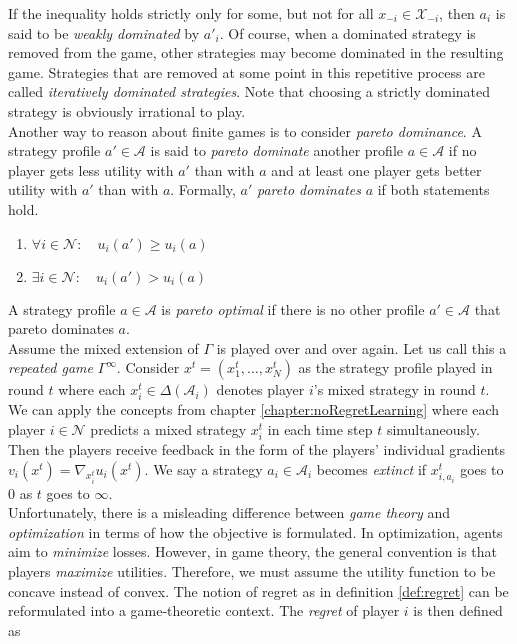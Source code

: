 If the inequality holds strictly only for some, but not for all $x_{-i} \in \mathcal{X}_{-i}$, then $a_i$ is said to be \textit{weakly dominated} by $a'_i$. Of course, when a dominated strategy is removed from the game, other strategies may become dominated in the resulting game. Strategies that are removed at some point in this repetitive process are called \textit{iteratively dominated strategies}. Note that choosing a strictly dominated strategy is obviously irrational to play. \\

Another way to reason about finite games is to consider \textit{pareto dominance}. A strategy profile $a' \in \mathcal{A}$ is said to \textit{pareto dominate} another profile $a \in \mathcal{A}$ if no player gets less utility with $a'$ than with $a$ and at least one player gets better utility with $a'$ than with $a$. Formally, $a'$ \textit{pareto dominates} $a$ if both statements hold.

\begin{enumerate}\centering
    \item $\forall i \in \mathcal{N}: \quad u_i(a') \ge u_i(a)$
    \item $\exists i \in \mathcal{N}: \quad u_i(a') > u_i(a)$
\end{enumerate}

A strategy profile $a \in \mathcal{A}$ is \textit{pareto optimal} if there is no other profile $a' \in \mathcal{A}$ that pareto dominates $a$. \\

Assume the mixed extension of $\Gamma$ is played over and over again. Let us call this a \textit{repeated game} $\Gamma^{\infty}$. Consider $x^t = (x_{1}^{t},\dots,x_{N}^{t})$ as the strategy profile played in round $t$ where each $x_{i}^{t} \in \Delta(\mathcal{A}_i)$ denotes player $i$'s mixed strategy in round $t$. We can apply the concepts from chapter \ref{chapter:noRegretLearning} where each player $i \in \mathcal{N}$ predicts a mixed strategy $x_{i}^{t}$ in each time step $t$ simultaneously. Then the players receive feedback in the form of the players' individual gradients $v_{i}(x^t) = \nabla_{x_{i}^{t}}u_{i}(x^t)$. We say a strategy $a_i \in \mathcal{A}_i$ becomes \textit{extinct} if $x_{i,a_i}^t$ goes to $0$ as $t$ goes to $\infty$. \\

Unfortunately, there is a misleading difference between \textit{game theory} and \textit{optimization} in terms of how the objective is formulated. In optimization, agents aim to \textit{minimize} losses. However, in game theory, the general convention is that players \textit{maximize} utilities. Therefore, we must assume the utility function to be concave instead of convex. The notion of regret as in definition \ref{def:regret} can be reformulated into a game-theoretic context. The \textit{regret} of player $i$ is then defined as

